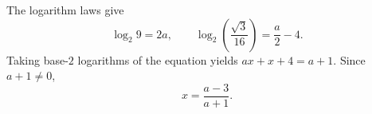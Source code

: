 The logarithm laws give
\[
\boxed{\log_2 9=2a},\qquad
\boxed{\log_2\left(\dfrac{\sqrt3}{16}\right)=\dfrac{a}{2}-4}.
\]
Taking base-$2$ logarithms of the equation yields $ax+x+4=a+1$. Since $a+1\ne0$,
\[
\boxed{x=\dfrac{a-3}{a+1}}.
\]
